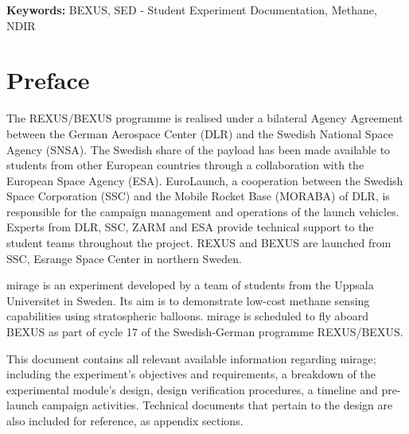 \documentclass[12pt,a4paper]{report}
\begin{document}
\textbf{Keywords:} BEXUS, SED - Student Experiment Documentation, Methane, NDIR

\tableofcontents

\listoffigures

\listoftables

\chapter*{Preface}

The REXUS/BEXUS programme is realised under a bilateral Agency Agreement between the German Aerospace Center (DLR) and the Swedish National Space Agency (SNSA). The Swedish share of the payload has been made available to students from other European countries through a collaboration with the European Space Agency (ESA). EuroLaunch, a cooperation between the Swedish Space Corporation (SSC) and the Mobile Rocket Base (MORABA) of DLR, is responsible for the campaign management and operations of the launch vehicles. Experts from DLR, SSC, ZARM and ESA provide technical support to the student teams throughout the project. REXUS and BEXUS are launched from SSC, Esrange Space Center in northern Sweden.

\ac{mirage} is an experiment developed by a team of students from the Uppsala Universitet in Sweden. Its aim is to demonstrate low-cost methane sensing capabilities using stratospheric balloons. \ac{mirage} is scheduled to fly aboard BEXUS as part of cycle 17 of the Swedish-German programme REXUS/BEXUS.

This document contains all relevant available information regarding \ac{mirage}; including the experiment's objectives and requirements, a breakdown of the experimental module's design, design verification procedures, a timeline and pre-launch campaign activities. Technical documents that pertain to the design are also included for reference, as appendix sections.

\end{document}
